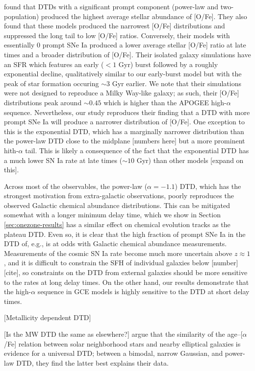 \documentclass[twocolumn,twocolappendix,linenumbers,trackchanges]{aastex631}
\begin{document}
\citet{Poulhazan2018-PrecisionPollution} found that DTDs with a significant prompt component (power-law and two-population) produced the highest average stellar abundance of [O/Fe]. They also found that these models produced the narrowest [O/Fe] distributions and suppressed the long tail to low [O/Fe] ratios. Conversely, their models with essentially 0 prompt SNe Ia produced a lower average stellar [O/Fe] ratio at late times and a broader distribution of [O/Fe]. Their isolated galaxy simulations have an SFR which features an early ($<1$ Gyr) burst followed by a roughly exponential decline, qualitatively similar to our early-burst model but with the peak of star formation occuring $\sim3$ Gyr earlier. We note that their simulations were not designed to reproduce a Milky Way-like galaxy; as such, their [O/Fe] distributions peak around $\sim0.45$ which is higher than the APOGEE high-$\alpha$ sequence. Nevertheless, our study reproduces their finding that a DTD with more prompt SNe Ia will produce a narrower distribution of [O/Fe]. One exception to this is the exponential DTD, which has a marginally narrower distribution than the power-law DTD close to the midplane [numbers here] but a more prominent hith-$\alpha$ tail. This is likely a consequence of the fact that the exponential DTD has a much lower SN Ia rate at late times ($\sim10$ Gyr) than other models [expand on this].

Across most of the observables, the power-law ($\alpha=-1.1$) DTD, which has the strongest motivation from extra-galactic observations, poorly reproduces the observed Galactic chemical abundance distributions. This can be mitigated somewhat with a longer minimum delay time, which we show in Section \ref{sec:onezone-results} has a similar effect on chemical evolution tracks as the plateau DTD. Even so, it is clear that the high fraction of prompt SNe Ia in the DTD of, e.g., \citet{Maoz2017-CosmicDTD} is at odds with Galactic chemical abundance measurements. 
Measurements of the cosmic SN Ia rate become much more uncertain above $z\approx1$, and it is difficult to constrain the SFH of individual galaxies below [number] [cite], so constraints on the DTD from external galaxies should be more sensitive to the rates at long delay times. On the other hand, our results demonstrate that the high-$\alpha$ sequence in GCE models is highly sensitive to the DTD at short delay times.

[Metallicity dependent DTD] \citet{Gandhi2022-MetallicityDependentRates,Johnson2023-Binaries}

[Is the MW DTD the same as elsewhere?]
\citet{Walcher2016-SelfSimilarity} argue that the similarity of the age--[$\alpha$/Fe] relation between solar neighborhood stars and nearby elliptical galaxies is evidence for a universal DTD; between a bimodal, narrow Gaussian, and power-law DTD, they find the latter best explains their data.
\end{document}
